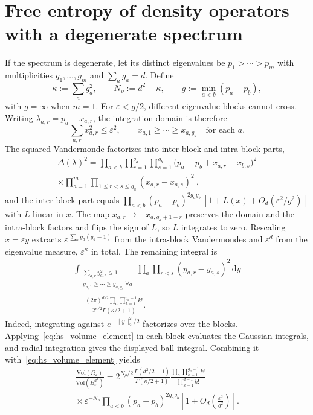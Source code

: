 \documentclass[aps,prl,twocolumn,superscriptaddress,amsmath,amssymb,reprint,longbibliography]{revtex4-2}
\newcommand{\dd}{\mathrm{d}}
\def\eps{\varepsilon}
\begin{document}
\section{Free entropy of density operators with a degenerate spectrum}
If the spectrum is degenerate, let its distinct eigenvalues be $p_1>\cdots>p_m$ with multiplicities $g_1,\ldots,g_m$ and $\sum_a g_a=d$. Define
\[
    \kappa:=\sum_a g_a^2,\qquad
    N_\rho:=d^2-\kappa,\qquad
    g:=\min_{a<b}(p_a-p_b),
\]
with $g=\infty$ when $m=1$. For $\eps<g/2$, different eigenvalue blocks cannot cross. Writing $\lambda_{a,r}=p_a+x_{a,r}$, the integration domain is therefore
\[
\sum_{a,r}x_{a,r}^2\le\eps^2,\qquad
x_{a,1}\ge\cdots\ge x_{a,g_a}\quad\text{for each }a.
\]
The squared Vandermonde factorizes into inter-block and intra-block parts,
\begin{multline*}
\Delta(\lambda)^2=\prod_{a<b}\prod_{r=1}^{g_a}\prod_{s=1}^{g_b}\big(p_a-p_b+x_{a,r}-x_{b,s}\big)^2\\
\times\prod_{a=1}^m\prod_{1\le r<s\le g_a}(x_{a,r}-x_{a,s})^2\ ,
\end{multline*}
and the inter-block part equals $\prod_{a<b}(p_a-p_b)^{2g_ag_b}\,[1+L(x)+O_d(\eps^2/g^2)]$ with $L$ linear in $x$. The map $x_{a,r}\mapsto-x_{a,g_a+1-r}$ preserves the domain and the intra-block factors and flips the sign of $L$, so $L$ integrates to zero. Rescaling $x=\eps y$ extracts $\eps^{\,\sum_a g_a(g_a-1)}$ from the intra-block Vandermondes and $\eps^{d}$ from the eigenvalue measure, $\eps^{\kappa}$ in total. The remaining integral is
\begin{multline*}
\int_{\substack{\sum_{a,r}y_{a,r}^2\le1\\
 y_{a,1}\ge\cdots\ge y_{a,g_a}\ \forall a}}
\prod_a\prod_{r<s}(y_{a,r}-y_{a,s})^2\,\dd y\\
=\frac{(2\pi)^{d/2}\prod_a\prod_{k=1}^{g_a-1}k!}
{2^{\kappa/2}\Gamma(\kappa/2+1)}.
\end{multline*}
Indeed, integrating against $e^{-\|y\|_2^2/2}$ factorizes over the blocks. Applying~\eqref{eq:hs_volume_element} in each block evaluates the Gaussian integrals, and radial integration gives the displayed ball integral. Combining it with~\eqref{eq:hs_volume_element} yields
\begin{multline}\label{eq:degenerate_volume}
    \frac{\mathrm{Vol}(\Omega_\eps)}
    {\mathrm{Vol}(B_\eps^{d^2})}
    =
    2^{N_\rho/2}
    \frac{\Gamma(d^2/2+1)}{\Gamma(\kappa/2+1)}
    \frac{\prod_a\prod_{k=1}^{g_a-1}k!}
    {\prod_{k=1}^{d-1}k!}\\
    {}\times\eps^{-N_\rho}
    \prod_{a<b}(p_a-p_b)^{2g_ag_b}
    \left[1+O_d\!\left(\frac{\eps^2}{g^2}\right)\right].
\end{multline}
\end{document}
